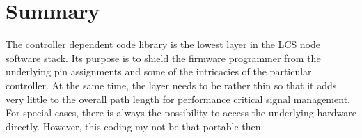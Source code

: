 \section{Summary}

The controller dependent code library is the lowest layer in the LCS node software stack. Its purpose is to shield the firmware programmer from the underlying pin assignments and some of the intricacies of the particular controller. At the same time, the layer needs to be rather thin so that it adds very little to the overall path length for performance critical signal management. For special cases, there is always the possibility to access the underlying hardware directly. However, this coding my not be that portable then.


